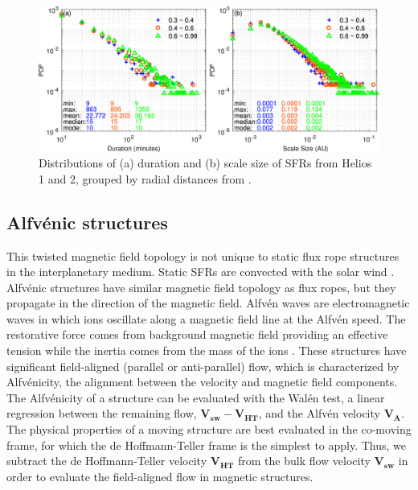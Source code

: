 \begin{figure}
    \centering
    \includegraphics[width=\textwidth]{Figures/helios_Chen21.jpg}
    \caption[Distributions of scale-size of SFRs from Helios 1 and 2 \citep{ChenHu:2020}]{Distributions of (a) duration and (b) scale size of SFRs from Helios 1 and 2, grouped by radial distances from \cite{ChenHu:2020}.}
    \label{fig:SFR-sizes}
\end{figure}

\subsection{Alfv\'enic structures}
This twisted magnetic field topology is not unique to static flux rope structures in the interplanetary medium. Static SFRs are convected with the solar wind \citep{Cartwright:2008}. Alfv\'enic structures have similar magnetic field topology as flux ropes, but they propagate in the direction of the magnetic field. Alfv\'en waves are electromagnetic waves in which ions oscillate along a magnetic field line at the Alfv\'en speed. The restorative force comes from background magnetic field providing an effective tension while the inertia comes from the mass of the ions \citep{Alfven:1942}. These structures have significant field-aligned (parallel or anti-parallel) flow, which is characterized by Alfv\'enicity, the alignment between the velocity and magnetic field components.  
The Alfv\'enicity of a structure can be evaluated with the Wal\'en test, a linear regression between the remaining flow, $\mathbf{V_{sw}} - \mathbf{V_{HT}}$, and the Alfv\'en velocity $\mathbf{V_A}$. The physical properties of a moving structure are best evaluated in the co-moving frame, for which the de Hoffmann-Teller frame \citep{deHoffman-Teller:1950} is the simplest to apply. Thus, we subtract the de Hoffmann-Teller velocity $\mathbf{V_{HT}}$ from the bulk flow velocity $\mathbf{V_{sw}}$ in order to evaluate the field-aligned flow in magnetic structures.

